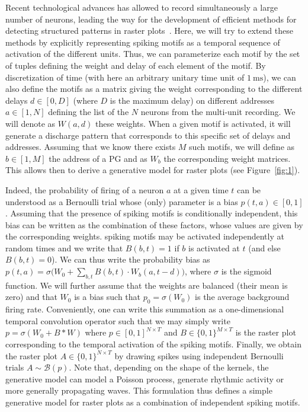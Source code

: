 \documentclass[11pt]{article}
\newcommand{\ms}{\si{\milli\second}}%
\begin{document}
%
%
Recent technological advances has allowed to record simultaneously a large number of neurons, leading the way for the development of efficient methods for detecting structured patterns in raster plots~\parencite{russo_cell_2017, stella_3d-spade_2019}. Here, we will try to extend these methods by explicitly representing spiking motifs as a temporal sequence of activation of the different units. Thus, we can parameterize each motif by the set of tuples defining the weight and delay of each element of the motif. By discretization of time (with here an arbitrary unitary time unit of $1~\ms$), we can also define the motifs as a matrix giving the weight corresponding to the different delays $d \in [0, D]$ (where $D$ is the maximum delay) on different addresses $a \in [1, N]$ defining the list of the $N$ neurons from the multi-unit recording. We will denote as $W(a, d)$ these weights. When a given motif is activated, it will generate a discharge pattern that corresponds to this specific set of delays and addresses. Assuming that we know there exists $M$ such motifs, we will define as $b \in [1, M]$ the address of a PG and as $W_b$ the corresponding weight matrices. This allows then to derive a generative model for raster plots (see Figure~\ref{fig:1}).

Indeed, the probability of firing of a neuron $a$ at a given time $t$ can be understood as a Bernoulli trial whose (only) parameter is a bias $p(t, a) \in [0, 1]$. Assuming that the presence of spiking motifs is conditionally independent, this bias can be written as the combination of these factors, whose values are given by the corresponding weights. spiking motifs may be activated independently at random times and  we write that $B(b, t)=1$ if $b$ is activated at $t$ (and else $B(b, t)=0$). We can thus write the probability bias as %
$%
p(t, a) = \sigma\big(W_0 + \sum_{b, t} B(b, t) \cdot W_b(a, t-d) \big)  
$, %
where $\sigma$ is the sigmoid function. We will further assume that the weights are balanced (their mean is zero) and that $W_0$ is a bias such that $p_0=\sigma(W_0)$ is the average background firing rate. Conveniently, one can write this summation as a one-dimensional temporal convolution operator such that we may simply write $p = \sigma(W_0 + B \ast W )$ where  $p\in [ 0, 1]^{N\times T}$ and $B\in \{0, 1\}^{M\times T}$ is the raster plot corresponding to the temporal activation of the spiking motifs. Finally, we obtain the raster plot $A\in \{0, 1\}^{N\times T}$ by drawing spikes using independent Bernoulli trials $A \sim \mathcal{B}(p)$. Note that, depending on the shape of the kernels, the generative model can model a Poisson process, generate rhythmic activity or more generally propagating waves. This formulation thus defines a simple generative model for raster plots as a combination of independent spiking motifs. 
\end{document}
